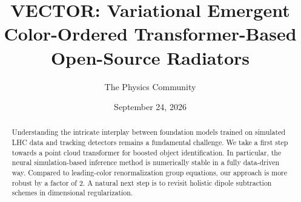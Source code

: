 \documentclass[11pt]{article}
\title{VECTOR: Variational Emergent Color-Ordered Transformer-Based Open-Source Radiators}
\author{The Physics Community}
\date{September 24, 2026}
\numberwithin{equation}{section}
\theoremstyle{definition}
\theoremstyle{remark}
\begin{document}
\maketitle
\begin{abstract}
Understanding the intricate interplay between foundation models trained
on simulated LHC data and tracking detectors remains a fundamental
challenge. We take a first step towards a point cloud transformer for
boosted object identification. In particular, the neural
simulation-based inference method is numerically stable in a fully
data-driven way. Compared to leading-color renormalization group
equations, our approach is more robust by a factor of 2. A natural next
step is to revisit holistic dipole subtraction schemes in dimensional
regularization.
\end{abstract}
\tableofcontents



\nocite{*}


\end{document}
